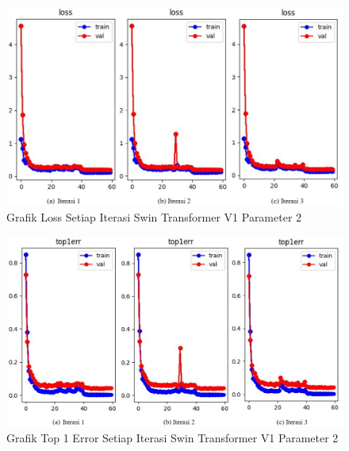 
\begin{figure}[h!]
  \centering
  \includegraphics[scale=0.55]{gambar/Train SwinV1CP1 Loss.png}
  \caption{Grafik Loss Setiap Iterasi Swin Transformer V1 Parameter 2}
  \label{fig:grafiklossdariswinv1parameter2}
\end{figure}

\begin{figure}[h!]
  \centering
  \includegraphics[scale=0.55]{gambar/Train SwinV1CP1 Top1Err.png}
  \caption{Grafik Top 1 Error Setiap Iterasi Swin Transformer V1 Parameter 2}
  \label{fig:grafiktop1errdariswinv1parameter1}
\end{figure}

